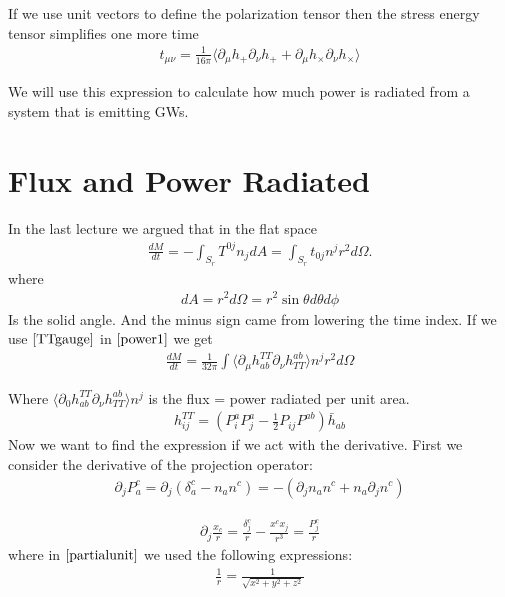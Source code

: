 \documentclass[11pt]{article}
\begin{document}
If we use unit vectors to define the polarization tensor then the stress energy tensor simplifies one more time
\begin{align}
t_{\mu\nu}= \frac{1}{16\pi}\langle \partial_\mu h_+ \partial_\nu h_+ + \partial_\mu h_\times \partial_\nu h_\times \rangle
\end{align}

We will use this expression to calculate how much power is radiated from a system that is emitting GWs.

\section{Flux and Power Radiated}
In the last lecture we argued that in the flat space 
\begin{align}
\frac{dM}{dt}= -\int_{S_r}T^{0j}n_j dA = \int_{S_r}t_{0j}n^j r^2 d\Omega .\label{power1}
\end{align}
where
\begin{align}
dA = r^2 d\Omega = r^2 \sin\theta d\theta d\phi
\end{align}
Is the solid angle.
And the minus sign came from lowering the time index.
If we use $\ref{TTgauge}$ in $\ref{power1}$ we get
\begin{align}
\frac{dM}{dt}= \frac{1}{32\pi}\int\langle \partial_\mu h^{TT}_{ab}\partial_\nu h^{ab}_{TT}\rangle n^j r^2 d\Omega \label{power2}
\end{align}

Where $\langle \partial_0 h^{TT}_{ab}\partial_\nu h^{ab}_{TT}\rangle n^j$ is the flux = power radiated per unit area.
\begin{align}
h^{TT}_{ij} = (P_i^a P_j^a - \frac{1}{2}P_{ij}P^{ab})\bar{h}_{ab}
\end{align}
Now we want to find the expression if we act with the derivative. First we consider the derivative of the projection operator:  
\begin{align}
\partial_j P_a^c = \partial_j(\delta_a^c - n_a n^c) = -(\partial_j n_a n^c + n_a\partial_j n^c)
\end{align}

\begin{align}
\partial_j \frac{x_c}{r} = \frac{\delta_j^c}{r} - \frac{x^c x_j}{r^3} = \frac{P_j^c}{r} \label{partialunit}
\end{align}
where in $\ref{partialunit}$ we used the following expressions:
\begin{align}
\frac{1}{r} = \frac{1}{\sqrt{x^2+y^2+z^2}}
\end{align}
\end{document}
